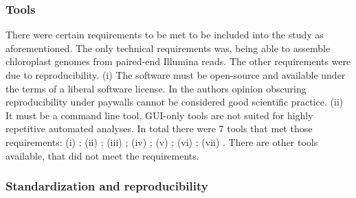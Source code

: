 \subsubsection{Tools}
There were certain requirements to be met to be included into the study as aforementioned. The only technical
requirements was, being able to assemble chloroplast genomes from paired-end Illumina reads. The other
requirements were due to reproducibility. (i) The software must be open-source and available under the terms
of a liberal software license. In the authors opinion obscuring reproducibility under paywalls cannot be
considered good scientific practice. (ii) It must be a command line tool, GUI-only tools are not suited for
highly repetitive automated analyses.  In total there were 7 tools that met those requirements: (i)
\hspace{0.5ex} \ce \hspace{0.5ex} \cite{j_ankenbrand_chloroextractor:_2018}; (ii) \hspace{0.5ex} \cassp
\hspace{0.5ex} \cite{sancho_comparative_2018}; (iii)\hspace{0.5ex} \go \hspace{0.5ex}
\cite{jin_getorganelle:_2018}; (iv) \hspace{0.5ex} \oa \hspace{0.5ex} \cite{coissac_barcodes_2016}; (v)
\hspace{0.5ex} \ioga \hspace{0.5ex} \cite{bakker_herbarium_2016}; (vi) \hspace{0.5ex} \fp \hspace{0.5ex}
\cite{mckain__fast-plast_2017}; (vii) \hspace{0.5ex} \np \hspace{0.5ex} \cite{dierckxsens_novoplasty:_2017}.
There are other tools available, that did not meet the requirements.

\subsubsection{Standardization and reproducibility}

